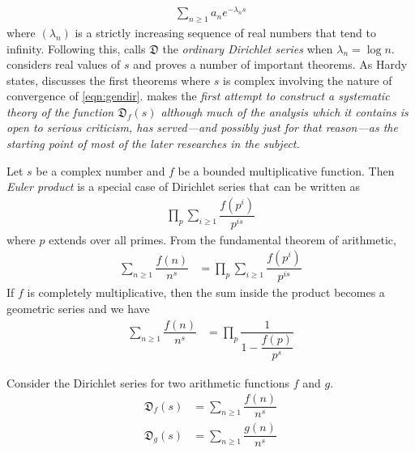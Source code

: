 \documentclass[elemannt.tex]{subfile}
\begin{document}
		\begin{align}
			\sum_{n\geq 1}a_{n}e^{-\lambda_{n}s}\label{eqn:gendir}
		\end{align}
	where $(\lambda_{n})$ is a strictly increasing sequence of real numbers that tend to infinity. Following this, \textcite{hardy_riesz_1915} calls $\mathfrak{D}$ the \textit{ordinary Dirichlet series} when $\lambda_{n}=\log{n}$. \textcite{lejeune_1879} considers real values of $s$ and proves a number of important theorems. As Hardy states, \textcite{jensen_1884,jensen_1888} discusses the first theorems where $s$ is complex involving the nature of convergence of \ref{eqn:gendir}. \textcite{cahen_1894} makes the \textit{first attempt to construct a systematic theory of the function $\mathfrak{D}_{f}(s)$ although much of the analysis which it contains is open to serious criticism, has served---and possibly just for that reason---as the starting point of most of the later researches in the subject.}
		\begin{definition}
			Let $s$ be a complex number and $f$ be a bounded multiplicative function. Then \textit{Euler product} is a special case of Dirichlet series that can be written as
				\begin{align*}
					\prod_{p}\sum_{i\geq 1}\dfrac{f(p^{i})}{p^{is}}
				\end{align*}
			where $p$ extends over all primes. From the fundamental theorem of arithmetic,
				\begin{align*}
					\sum_{n\geq 1}\dfrac{f(n)}{n^{s}}
						& = \prod_{p}\sum_{i\geq 1}\dfrac{f(p^{i})}{p^{is}}
				\end{align*}
			If $f$ is completely multiplicative, then the sum inside the product becomes a geometric series and we have
				\begin{align*}
					\sum_{n\geq 1}\dfrac{f(n)}{n^{s}}
						& = \prod_{p}\dfrac{1}{1-\dfrac{f(p)}{p^{s}}}
				\end{align*}
		\end{definition}
	Consider the Dirichlet series for two arithmetic functions $f$ and $g$.
		\begin{align*}
			\mathfrak{D}_{f}(s)
				& = \sum_{n\geq 1}\dfrac{f(n)}{n^{s}}\\
			\mathfrak{D}_{g}(s)
				& = \sum_{n\geq 1}\dfrac{g(n)}{n^{s}}
		\end{align*}
\end{document}
